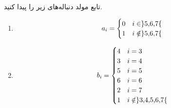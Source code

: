     \p
    تابع مولد دنباله‌های 
   زیر را پیدا کنید.        
   \begin{enumerate}
            \item 
               
                \[
                a_i = \begin{cases}
                    0 & i\in $\}5,6,7\{$\\
                    1 & i \notin $\}5,6,7\{$
                \end{cases}
                \]
                
            \item
               
                \[
                b_i = \begin{cases}
                        4 & i = 3\\
                        3 & i = 4\\
                        5 & i = 5\\
                        6 & i = 6\\
                        2 & i = 7\\
                        1 & i \notin $\}3,4,5,6,7\{$
                \end{cases}
                \]
                
        \end{enumerate}

